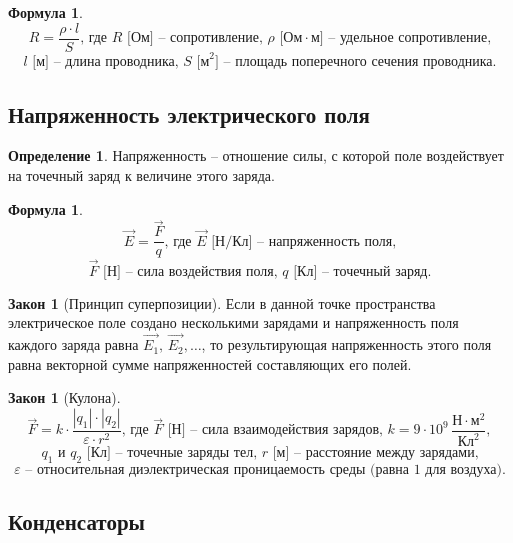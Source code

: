 \documentclass[12pt]{article}
\theoremstyle{definition}
\newtheorem{definition}{Определение}
\newtheorem{law}[theorem]{Закон}
\newtheorem{formula}[theorem]{Формула}
\begin{document}
\begin{formula}
    $$R=\frac{\rho\cdot l}{S}\text{, где }R\text{ [Ом] – сопротивление, }\rho\text{ [Ом}\cdot \text{м] -- удельное сопротивление,}$$
$$l\text{ [м] – длина проводника, }S\text{ [м}^2\text{] -- площадь поперечного сечения проводника.}$$
\end{formula}

\subsection{Напряженность электрического поля}

\begin{definition}
    Напряженность -- отношение силы, с которой поле воздействует на точечный заряд к величине этого заряда.
\end{definition}
\begin{formula}
    $$\vec{E}=\frac{\vec{F}}{q}\text{, где }\vec{E}\text{ [Н/Кл] – напряженность поля,}$$
$$\vec{F}\text{ [Н] -- сила воздействия поля, }q\text{ [Кл] – точечный заряд.}$$
\end{formula}
\begin{law}[Принцип суперпозиции]
    Если в данной точке пространства электрическое поле создано несколькими зарядами и напряженность поля каждого заряда равна $\vec{E_1},\,\vec{E_2},\ldots$, то результирующая напряженность этого поля равна векторной сумме напряженностей составляющих его полей.
\end{law}
\begin{law}[Кулона]
    $$\vec{F}=k\cdot \frac{|q_1|\cdot|q_2|}{\varepsilon\cdot r^2}\text{, где }\vec{F}\text{ [Н] -- сила взаимодействия зарядов, }k=9\cdot 10^9\,\frac{\text{Н}\cdot\text{м}^2}{\text{Кл}^2},$$
    $$q_1\text{ и }q_2\text{ [Кл] -- точечные заряды тел, }r\text{ [м] -- расстояние между зарядами,}$$
    $$\varepsilon\text{ -- относительная диэлектрическая проницаемость среды (равна 1 для воздуха).}$$
\end{law}

\subsection{Конденсаторы}
\end{document}
